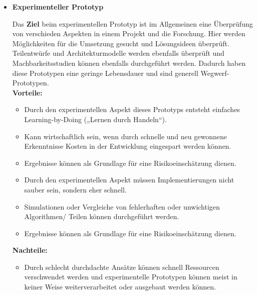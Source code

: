 \documentclass{swp1}
\begin{document}
\begin{itemize}
\item \textbf{Experimenteller Prototyp}

Das \textbf{Ziel} beim experimentellen Prototyp ist im Allgemeinen eine Überprüfung von verschieden Aspekten in einem Projekt und die Forschung. Hier werden Möglichkeiten für die Umsetzung gesucht und Lösungsideen überprüft. Teilentwürfe und Architekturmodelle werden ebenfalls überprüft und Machbarkeitsstudien können ebenfalls durchgeführt werden. Dadurch haben diese Prototypen eine geringe Lebensdauer und sind generell Wegwerf-Prototypen.\\

\textbf{Vorteile:}
\begin{itemize}
\item Durch den experimentellen Aspekt dieses Prototyps entsteht einfaches Learning-by-Doing („Lernen durch Handeln“).
\end{itemize}

\begin{itemize}
\item Kann wirtschaftlich sein, wenn durch schnelle und neu gewonnene Erkenntnisse Kosten in der Entwicklung eingespart werden können.
\end{itemize}

\begin{itemize}
\item Ergebnisse können als Grundlage für eine Risikoeinschätzung dienen.
\end{itemize}

\begin{itemize}
\item Durch den experimentellen Aspekt müssen Implementierungen nicht sauber sein, sondern eher schnell.
\end{itemize}

\begin{itemize}
\item Simulationen oder Vergleiche von fehlerhaften oder unwichtigen Algorithmen/ Teilen können durchgeführt werden.
\end{itemize}

\begin{itemize}
\item Ergebnisse können als Grundlage für eine Risikoeinschätzung dienen.
\end{itemize}


\textbf{Nachteile:}
\begin{itemize}
\item Durch schlecht durchdachte Ansätze können schnell Ressourcen verschwendet werden und experimentelle Prototypen können meist in keiner Weise weiterverarbeitet oder ausgebaut werden können.
\end{itemize}


\end{itemize}
\end{document}
